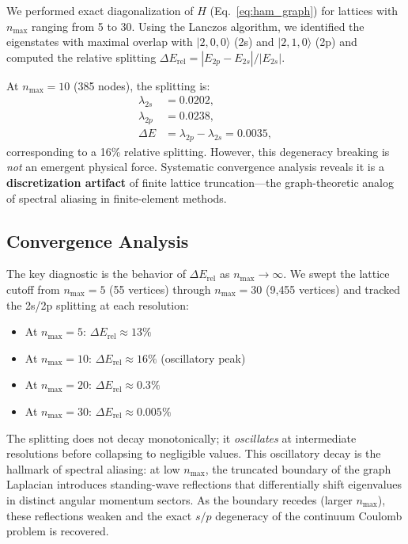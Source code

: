 \documentclass[aps,pra,twocolumn,superscriptaddress,longbibliography]{revtex4-2}
\begin{document}
We performed exact diagonalization of $H$ (Eq.~\ref{eq:ham_graph})
for lattices with $n_{\max}$ ranging from 5 to 30. Using the Lanczos
algorithm, we identified the eigenstates with maximal overlap with
$|2,0,0\rangle$ (2s) and $|2,1,0\rangle$ (2p) and computed the
relative splitting $\Delta E_{\mathrm{rel}} = |E_{2p} - E_{2s}|/|E_{2s}|$.

At $n_{\max} = 10$ (385 nodes), the splitting is:
\begin{align}
\lambda_{2s} &= 0.0202, \\
\lambda_{2p} &= 0.0238, \\
\Delta E &= \lambda_{2p} - \lambda_{2s} = 0.0035,
\end{align}
corresponding to a 16\% relative splitting. However, this degeneracy
breaking is \emph{not} an emergent physical force. Systematic
convergence analysis reveals it is a \textbf{discretization artifact}
of finite lattice truncation---the graph-theoretic analog of spectral
aliasing in finite-element methods.

\subsection{Convergence Analysis}

The key diagnostic is the behavior of $\Delta E_{\mathrm{rel}}$ as
$n_{\max} \to \infty$. We swept the lattice cutoff from $n_{\max} = 5$
(55 vertices) through $n_{\max} = 30$ (9{,}455 vertices) and tracked
the 2s/2p splitting at each resolution:

\begin{itemize}
  \item At $n_{\max} = 5$: $\Delta E_{\mathrm{rel}} \approx 13\%$
  \item At $n_{\max} = 10$: $\Delta E_{\mathrm{rel}} \approx 16\%$
    (oscillatory peak)
  \item At $n_{\max} = 20$: $\Delta E_{\mathrm{rel}} \approx 0.3\%$
  \item At $n_{\max} = 30$: $\Delta E_{\mathrm{rel}} \approx 0.005\%$
\end{itemize}

The splitting does not decay monotonically; it \emph{oscillates} at
intermediate resolutions before collapsing to negligible values. This
oscillatory decay is the hallmark of spectral aliasing: at low
$n_{\max}$, the truncated boundary of the graph Laplacian introduces
standing-wave reflections that differentially shift eigenvalues in
distinct angular momentum sectors. As the boundary recedes (larger
$n_{\max}$), these reflections weaken and the exact $s/p$ degeneracy
of the continuum Coulomb problem is recovered.
\end{document}
